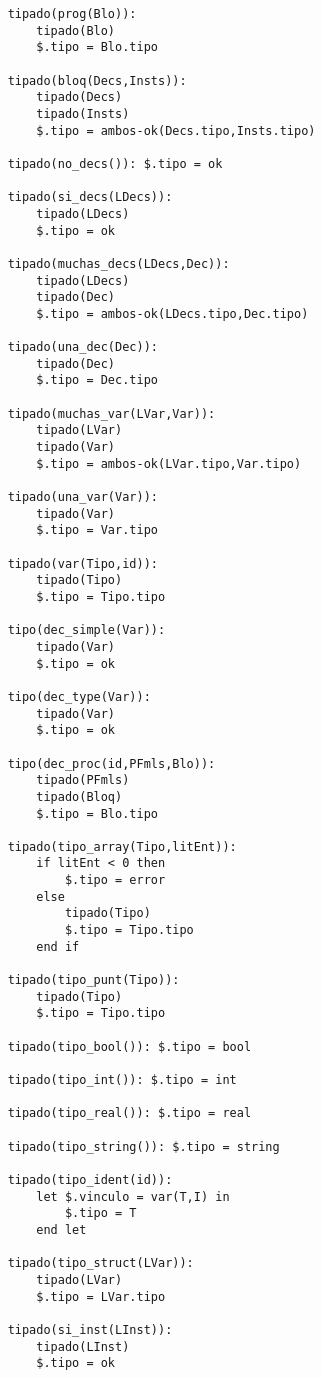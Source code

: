 
\begin{lstlisting}
    tipado(prog(Blo)):
        tipado(Blo)
        $.tipo = Blo.tipo

    tipado(bloq(Decs,Insts)):
        tipado(Decs)
        tipado(Insts)
        $.tipo = ambos-ok(Decs.tipo,Insts.tipo)

    tipado(no_decs()): $.tipo = ok
    
    tipado(si_decs(LDecs)):
        tipado(LDecs)
        $.tipo = ok

    tipado(muchas_decs(LDecs,Dec)):
        tipado(LDecs)
        tipado(Dec)
        $.tipo = ambos-ok(LDecs.tipo,Dec.tipo)
    
    tipado(una_dec(Dec)):
        tipado(Dec)
        $.tipo = Dec.tipo

    tipado(muchas_var(LVar,Var)):
        tipado(LVar)
        tipado(Var)
        $.tipo = ambos-ok(LVar.tipo,Var.tipo)

    tipado(una_var(Var)):
        tipado(Var)
        $.tipo = Var.tipo
    
    tipado(var(Tipo,id)):
        tipado(Tipo)
        $.tipo = Tipo.tipo

    tipo(dec_simple(Var)):
        tipado(Var)
        $.tipo = ok

    tipo(dec_type(Var)):
        tipado(Var)
        $.tipo = ok
    
    tipo(dec_proc(id,PFmls,Blo)):
        tipado(PFmls)
        tipado(Bloq)
        $.tipo = Blo.tipo

    tipado(tipo_array(Tipo,litEnt)):
        if litEnt < 0 then
            $.tipo = error
        else
            tipado(Tipo)
            $.tipo = Tipo.tipo 
        end if

    tipado(tipo_punt(Tipo)):
        tipado(Tipo)
        $.tipo = Tipo.tipo

    tipado(tipo_bool()): $.tipo = bool

    tipado(tipo_int()): $.tipo = int

    tipado(tipo_real()): $.tipo = real

    tipado(tipo_string()): $.tipo = string

    tipado(tipo_ident(id)):
        let $.vinculo = var(T,I) in
            $.tipo = T
        end let

    tipado(tipo_struct(LVar)):
        tipado(LVar)
        $.tipo = LVar.tipo

    tipado(si_inst(LInst)):
        tipado(LInst)
        $.tipo = ok


\end{lstlisting}
